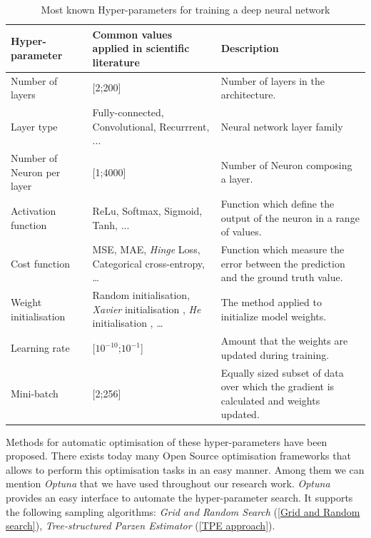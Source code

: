 \begin{table}
\label{tab:hyper-parameters}
\begin{tabular}{|l|p{4cm}|p{4cm}|}
\hline
\textbf{Hyper-parameter}           &  \textbf{Common values applied in scientific literature}  & \textbf{Description}                                    \\ \hline
Number of layers          & {[}2;200{]}                                     & Number of layers in the architecture.           \\ \hline
Layer type                & Fully-connected, Convolutional, Recurrrent, ... & Neural network layer family                                               \\ \hline
Number of Neuron per layer & {[}1;4000{]}                                    & Number of Neuron composing a layer.                                               \\ \hline
Activation function       & ReLu, Softmax, Sigmoid, Tanh, ...               & Function which define the output of the neuron in a range of values.                                                \\ \hline
Cost function             & MSE, MAE, \textit{Hinge} Loss, Categorical cross-entropy, \dots                                                & Function which measure the error between the prediction and the ground truth value.                                               \\ \hline
Weight initialisation     & Random initialisation, \textit{Xavier} initialisation \cite{glorot2010understanding}, \textit{He} initialisation \citep{he2015delving}, \dots                                                & The method applied to initialize model weights. \\ \hline
Learning rate             & {[}$10^{-10}$;$10^{-1}${]}                                                  &  Amount that the weights are updated during training.                                               \\ \hline
Mini-batch                & {[}2;256{]}                                     & Equally sized subset of data over which the gradient is calculated and weights updated.                                               \\ \hline
\end{tabular}
\caption{Most known Hyper-parameters for training a deep neural network}
\end{table}

Methods for automatic optimisation of these hyper-parameters have been proposed. There exists today many Open Source optimisation frameworks that allows to perform this optimisation tasks in an easy manner. Among them we can mention \textit{Optuna} \citep{optuna_2019} that we have used throughout our research work. \textit{Optuna} provides an easy interface to automate the hyper-parameter search. It supports the following sampling algorithms: \textit{Grid and Random Search} (\ref{Grid and Random search}), \textit{Tree-structured Parzen Estimator} (\ref{TPE approach}).


